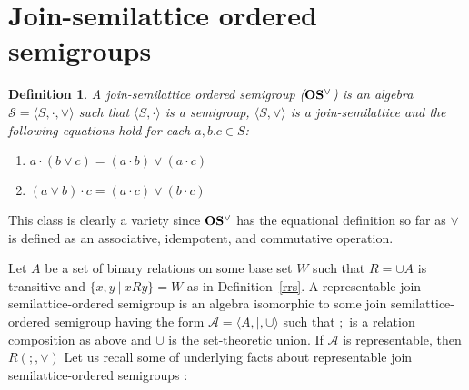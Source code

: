 \documentclass[a4paper]{article}
\theoremstyle{defin}
\newtheorem{defin}{Definition}
\theoremstyle{theorem}
\theoremstyle{prop}
\theoremstyle{lemma}
\theoremstyle{ex}
\theoremstyle{col}
\begin{document}
\section{Join-semilattice ordered semigroups}

\begin{defin} A join-semilattice ordered semigroup (${\bf OS^{\vee}}$) is an algebra $\mathcal{S} = \langle S, \cdot, \vee \rangle$ such that $\langle S, \cdot \rangle$ is a semigroup, $\langle S, \vee \rangle$ is a join-semilattice and the following equations hold for each $a, b. c \in S$:

  \begin{enumerate}
    \item $a \cdot (b \vee c) = (a \cdot b) \vee (a \cdot c)$
    \item $(a \vee b) \cdot c = (a \cdot c) \vee (b \cdot c)$
  \end{enumerate}
\end{defin}
This class is clearly a variety since ${\bf OS^{\vee}}$ has the equational definition so far as $\vee$ is defined as an associative, idempotent, and commutative operation.

Let $A$ be a set of binary relations on some base set $W$ such that $R = \cup A$ is transitive and $\{ x, y \: | \: x R y \} = W$ as in Definition~\ref{rrs}. A representable join semilattice-ordered semigroup is an algebra isomorphic to some join semilattice-ordered semigroup having the form $\mathcal{A} = \langle A, |, \cup \rangle$ such that $;$ is a relation composition as above and $\cup$ is the set-theoretic union. If $\mathcal{A}$ is representable, then $R(;, \vee)$ Let us recall some of underlying facts about representable join semilattice-ordered semigroups \cite{andreka1991representations}:
\end{document}
